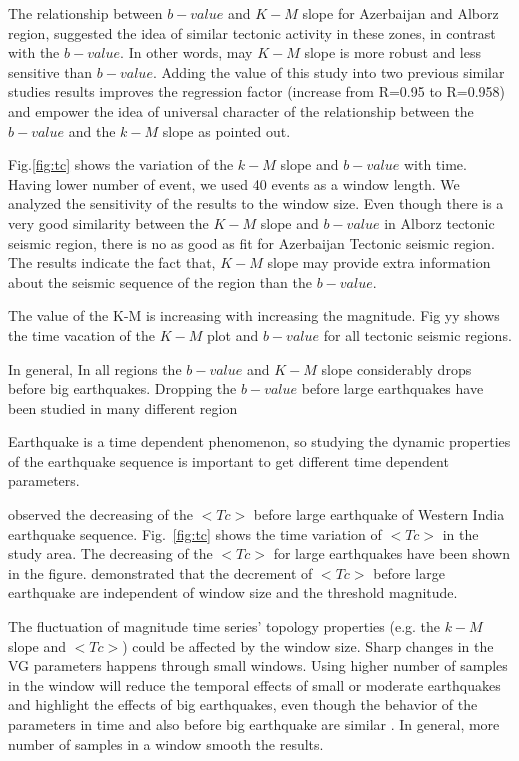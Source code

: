 \noindent
The relationship between $b-value$ and $K-M$ slope for Azerbaijan and Alborz region, suggested the idea of similar tectonic activity in these zones, in contrast with the $b-value$. In other words, may $K-M$ slope is more robust and less sensitive than $b-value$. Adding the value of this study into two previous similar studies results improves the regression factor (increase from R=0.95 to R=0.958) and empower the idea of universal character of the relationship between the $b-value$ and the $k-M$ slope as \citet{Telesca2014} pointed out. 





\noindent 
Fig.\ref{fig:tc}  shows the variation of the $k-M$ slope and $b-value$ with time. Having lower number of event, we used 40 events as a window length. We analyzed the sensitivity of the results to the window size. Even though there is a very good similarity between the $K-M$ slope and $b-value$ in Alborz tectonic seismic region, there is no as good as fit for Azerbaijan Tectonic seismic region. The results indicate the fact that, $K-M$ slope may provide extra information about the seismic sequence of the region than the $b-value$. 
 
The value of the K-M is increasing with increasing the magnitude. Fig yy shows the time vacation of the $K-M$ plot and $b-value$ for all tectonic seismic regions. 

In general, In all regions the $b-value$ and $K-M$ slope considerably drops before  big earthquakes. Dropping the $b-value$ before large earthquakes have been studied in many different region \citep[e.g.][]{Wyss2000,Wyss2006,Schorlemmer2005,Chan2012}


Earthquake is a time dependent phenomenon, so studying the dynamic properties of the earthquake sequence is important to get different time dependent parameters. 

 \citet{Telesca2016} observed the decreasing of the $<Tc>$ before large earthquake of Western India earthquake sequence. Fig.~\ref{fig:tc} shows the time variation of $<Tc>$ in the study area. The decreasing of the $<Tc>$ for large earthquakes have been shown in the figure. \citet{Telesca2016} demonstrated that the decrement of $<Tc>$ before large earthquake are independent of window size and the threshold magnitude. 
 
The fluctuation of magnitude time series' topology properties (e.g. the $k-M$ slope and $<Tc>$) could be affected by the window size. Sharp changes in the VG parameters happens through small windows. Using higher number of samples in the window will reduce the temporal effects of small or moderate earthquakes and highlight the effects of big earthquakes, even though the behavior of the parameters in time and also before big earthquake are similar \citep{Telesca2016}. In general, more number of samples in a window smooth the results. 
 
